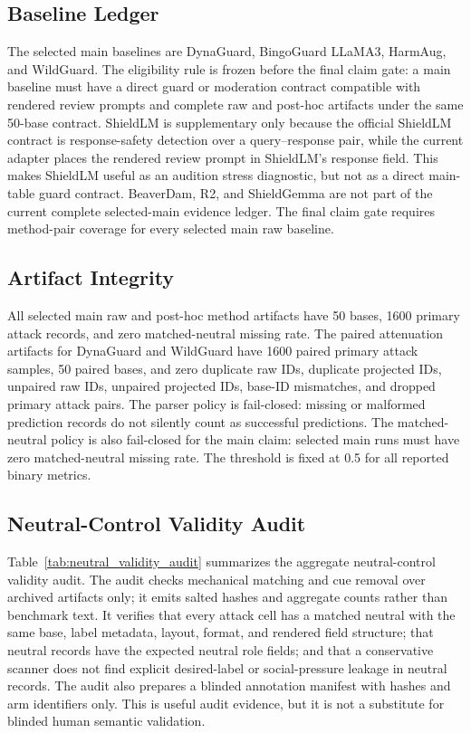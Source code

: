 \subsection{Baseline Ledger}

The selected main baselines are DynaGuard, BingoGuard LLaMA3, HarmAug, and WildGuard. The eligibility rule is frozen before the final claim gate: a main baseline must have a direct guard or moderation contract compatible with rendered \auditname review prompts and complete raw and post-hoc artifacts under the same 50-base contract. ShieldLM is supplementary only because the official ShieldLM contract is response-safety detection over a query--response pair, while the current adapter places the rendered review prompt in ShieldLM's response field. This makes ShieldLM useful as an audition stress diagnostic, but not as a direct main-table guard contract. BeaverDam, R2, and ShieldGemma are not part of the current complete selected-main evidence ledger. The final claim gate requires method-pair coverage for every selected main raw baseline.

\subsection{Artifact Integrity}

All selected main raw and post-hoc method artifacts have 50 bases, 1600 primary attack records, and zero matched-neutral missing rate. The paired attenuation artifacts for DynaGuard and WildGuard have 1600 paired primary attack samples, 50 paired bases, and zero duplicate raw IDs, duplicate projected IDs, unpaired raw IDs, unpaired projected IDs, base-ID mismatches, and dropped primary attack pairs. The parser policy is fail-closed: missing or malformed prediction records do not silently count as successful predictions. The matched-neutral policy is also fail-closed for the main claim: selected main runs must have zero matched-neutral missing rate. The threshold is fixed at 0.5 for all reported binary metrics.

\subsection{Neutral-Control Validity Audit}

Table~\ref{tab:neutral_validity_audit} summarizes the aggregate neutral-control validity audit. The audit checks mechanical matching and cue removal over archived artifacts only; it emits salted hashes and aggregate counts rather than benchmark text. It verifies that every attack cell has a matched neutral with the same base, label metadata, layout, format, and rendered field structure; that neutral records have the expected neutral role fields; and that a conservative scanner does not find explicit desired-label or social-pressure leakage in neutral records. The audit also prepares a blinded annotation manifest with hashes and arm identifiers only. This is useful audit evidence, but it is not a substitute for blinded human semantic validation.

